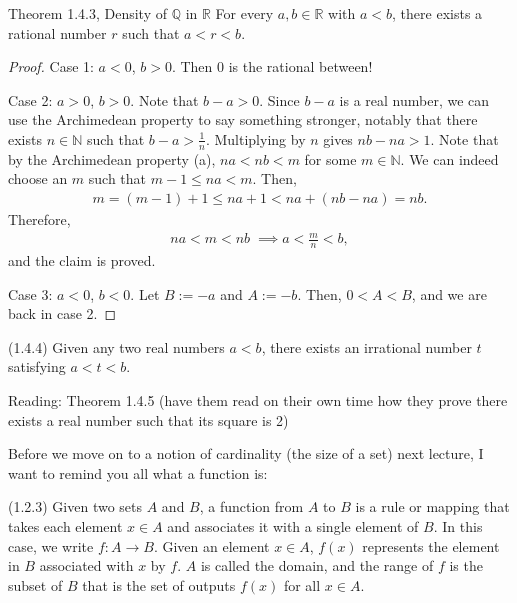 \documentclass{ximera}
\begin{document}
\begin{theorem}{Theorem 1.4.3, Density of $\mathbb{Q}$ in $\mathbb{R}$}
For every $a,b \in \mathbb{R}$ with $a < b$, there exists a rational number $r$ such that $a < r< b$.
\end{theorem}
\begin{proof}
    Case 1: $a < 0$, $b > 0$.  Then $0$ is the rational between!
    
    Case 2: $a > 0$, $b > 0$.
    Note that $b-a > 0$.  Since $b-a$ is a real number, we can use the Archimedean property to say something stronger, notably that there exists $n \in \mathbb{N}$ such that $b-a > \frac{1}n$.  Multiplying by $n$ gives $nb - na > 1$.   Note that by the Archimedean property (a), $na < nb < m$ for some $m \in \mathbb{N}$.  We can indeed choose an $m$ such that $m-1 \leq na < m$.  Then, 
    \begin{align*}
        m = (m-1) +1 \leq na + 1< na + (nb - na) = nb.
    \end{align*}
    Therefore, 
    \begin{align*}
        na < m < nb  \; \implies a < \frac{m}{n} < b,
    \end{align*}
    and the claim is proved.
    
    Case 3:  $a < 0$, $b < 0$.  Let $B := -a$ and $A := -b$.  Then, $ 0 < A < B$, and we are back in case 2.
\end{proof}

\begin{corollary}{(1.4.4)}
    Given any two real numbers $a < b$, there exists an irrational number $t$ satisfying $a < t< b$.
\end{corollary}

Reading: Theorem 1.4.5 (have them read on their own time how they prove there exists a real number such that its square is 2)

Before we move on to a notion of cardinality (the size of a set) next lecture, I want to remind you all what a function is:

\begin{definition}{(1.2.3)}
    Given two sets $A$ and $B$, a function from $A$ to $B$ is a rule or mapping that takes each element $x \in A$ and associates it with a single element of $B$.  In this case, we write $f : A \to B$.  Given an element $x \in A$, $f(x)$ represents the element in $B$ associated with $x$ by $f$.  $A$ is called the domain, and the range of $f$ is the subset of $B$ that is the set of outputs $f(x)$ for all $x \in A$.
\end{definition}
\end{document}
